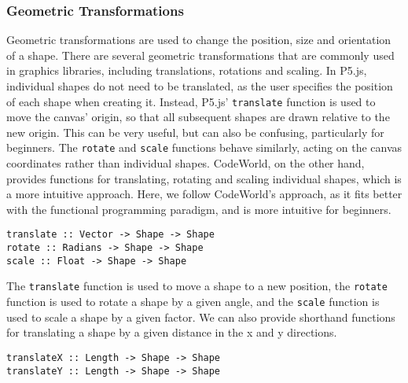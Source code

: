 \documentclass[../main.tex]{subfiles}
\begin{document}
            \subsubsection{Geometric Transformations}
                Geometric transformations are used to change the position, size and orientation
                    of a shape.
                There are several geometric transformations that are commonly used in graphics
                    libraries, including translations, rotations and scaling.
                In P5.js, individual shapes do not need to be translated, as the user specifies
                    the position of each shape when creating it.
                Instead, P5.js' \texttt{translate} function is used to move the canvas' origin,
                    so that all subsequent shapes are drawn relative to the new origin.
                This can be very useful, but can also be confusing, particularly for beginners.
                The \texttt{rotate} and \texttt{scale} functions behave similarly, acting on
                    the canvas coordinates rather than individual shapes.
                CodeWorld, on the other hand, provides functions for translating, rotating and
                    scaling individual shapes, which is a more intuitive approach.
                Here, we follow CodeWorld's approach, as it fits better with the functional
                    programming paradigm, and is more intuitive for beginners.

                \begin{lstlisting}[label={lst:geometric}, caption={The geometric transformation functions.}]
translate :: Vector -> Shape -> Shape
rotate :: Radians -> Shape -> Shape
scale :: Float -> Shape -> Shape\end{lstlisting}

                The \texttt{translate} function is used to move a shape to a new position, the
                    \texttt{rotate} function is used to rotate a shape by a given angle, and the
                    \texttt{scale} function is used to scale a shape by a given factor.
                We can also provide shorthand functions for translating a shape by a given
                    distance in the x and y directions.

                \begin{lstlisting}[label={lst:shorthandTransform}, caption={The shorthand translation functions.}]
translateX :: Length -> Shape -> Shape
translateY :: Length -> Shape -> Shape\end{lstlisting}
\end{document}
